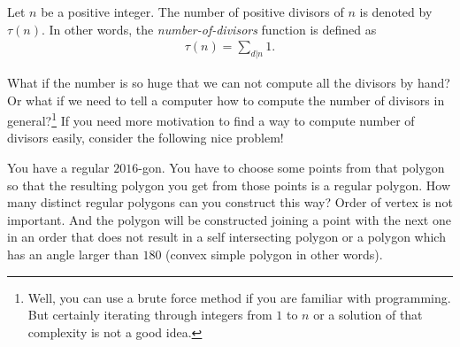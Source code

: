\documentclass[12pt]{subfile}
\begin{document}
			\begin{definition}
				Let $n$ be a positive integer. The number of positive divisors of $n$ is denoted by $\tau(n)$. In other words, the \textit{number-of-divisors} function is defined as
					\begin{align*}
						\tau(n)=\sum_{d|n} 1.
					\end{align*}
			\end{definition}
		What if the number is so huge that we can not compute all the divisors by hand? Or what if we need to tell a computer how to compute the number of divisors in general?\footnote{Well, you can use a brute force method if you are familiar with programming. But certainly iterating through integers from $1$ to $n$ or a solution of that complexity is not a good idea.} If you need more motivation to find a way to compute number of divisors easily, consider the following nice problem!
			\begin{problem}
				You have a regular $2016$-gon. You have to choose some points from that polygon so that the resulting polygon you get from those points is a regular polygon. How many distinct regular polygons can you construct this way? Order of vertex is not important. And the polygon will be constructed joining a point with the next one in an order that does not result in a self intersecting polygon or a polygon which has an angle larger than $180$ (convex simple polygon in other words).
			\end{problem}
\end{document}
